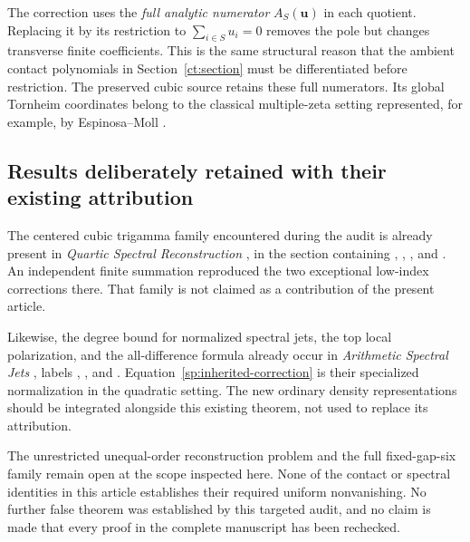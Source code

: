 The correction uses the \emph{full analytic numerator}
\(A_S(\boldsymbol u)\) in each quotient. Replacing it by its restriction
to \(\sum_{i\in S}u_i=0\) removes the pole but changes transverse finite
coefficients. This is the same structural reason that the ambient contact
polynomials in Section~\ref{ct:section} must be differentiated before
restriction. The preserved cubic source retains these full numerators.
Its global Tornheim coordinates belong to the classical multiple-zeta
setting represented, for example, by Espinosa--Moll \cite{EspinosaMoll}.

\subsection{Results deliberately retained with their existing attribution}

The centered cubic trigamma family encountered during the audit is already
present in \emph{Quartic Spectral Reconstruction}
\cite{ProveItQuartic}, in the section containing
, , , and .
An independent finite summation reproduced the two exceptional
low-index corrections there. That family is not claimed as a contribution
of the present article.

Likewise, the degree bound for normalized spectral jets, the top local
polarization, and the all-difference formula already occur in
\emph{Arithmetic Spectral Jets}
\cite{ProveItArithmeticJets}, labels
,
, and
.
Equation~\eqref{sp:inherited-correction} is their specialized
normalization in the quadratic setting. The new ordinary density
representations should be integrated alongside this existing theorem,
not used to replace its attribution.

The unrestricted unequal-order reconstruction problem and the full
fixed-gap-six family remain open at the scope inspected here. None of the
contact or spectral identities in this article establishes their required
uniform nonvanishing. No further false theorem was established by this
targeted audit, and no claim is made that every proof in the complete
manuscript has been rechecked.
